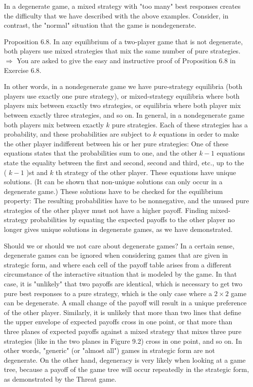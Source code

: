 \documentclass[12pt]{article}
\begin{document}
In a degenerate game, a mixed strategy with "too many" best responses creates the difficulty that we have described with the above examples. Consider, in contrast, the "normal" situation that the game is nondegenerate.

Proposition 6.8. In any equilibrium of a two-player game that is not degenerate, both players use mixed strategies that mix the same number of pure strategies.\\
$\Rightarrow$ You are asked to give the easy and instructive proof of Proposition 6.8 in Exercise 6.8.

In other words, in a nondegenerate game we have pure-strategy equilibria (both players use exactly one pure strategy), or mixed-strategy equilibria where both players mix between exactly two strategies, or equilibria where both player mix between exactly three strategies, and so on. In general, in a nondegenerate game both players mix between exactly $k$ pure strategies. Each of these strategies has a probability, and these probabilities are subject to $k$ equations in order to make the other player indifferent between his or her pure strategies: One of these equations states that the probabilities sum to one, and the other $k-1$ equations state the equality between the first and second, second and third, etc., up to the\\
( $k-1$ )st and $k$ th strategy of the other player. These equations have unique solutions. (It can be shown that non-unique solutions can only occur in a degenerate game.) These solutions have to be checked for the equilibrium property: The resulting probabilities have to be nonnegative, and the unused pure strategies of the other player must not have a higher payoff. Finding mixed-strategy probabilities by equating the expected payoffs to the other player no longer gives unique solutions in degenerate games, as we have demonstrated.

Should we or should we not care about degenerate games? In a certain sense, degenerate games can be ignored when considering games that are given in strategic form, and where each cell of the payoff table arises from a different circumstance of the interactive situation that is modeled by the game. In that case, it is "unlikely" that two payoffs are identical, which is necessary to get two pure best responses to a pure strategy, which is the only case where a $2 \times 2$ game can be degenerate. A small change of the payoff will result in a unique preference of the other player. Similarly, it is unlikely that more than two lines that define the upper envelope of expected payoffs cross in one point, or that more than three planes of expected payoffs against a mixed strategy that mixes three pure strategies (like in the two planes in Figure 9.2) cross in one point, and so on. In other words, "generic" (or "almost all") games in strategic form are not degenerate. On the other hand, degeneracy is very likely when looking at a game tree, because a payoff of the game tree will occur repeatedly in the strategic form, as demonstrated by the Threat game.
\end{document}

